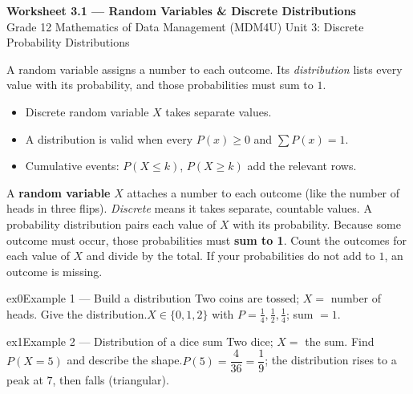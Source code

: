 \documentclass[11pt]{article}
\begin{document}
\begin{center}
{\LARGE\bfseries\color{titleblue}Worksheet 3.1 --- Random Variables \& Discrete Distributions}\\[2pt]
{\small Grade 12 Mathematics of Data Management (MDM4U) \textperiodcentered{} Unit 3: Discrete Probability Distributions}
\end{center}

\begin{ideabox}
A random variable assigns a number to each outcome. Its \emph{distribution} lists every value with its probability, and those probabilities must sum to $1$.
\begin{itemize}[leftmargin=*,itemsep=2pt]
  \item Discrete random variable $X$ takes separate values.
  \item A distribution is valid when every $P(x)\ge0$ and $\sum P(x)=1$.
  \item Cumulative events: $P(X\le k)$, $P(X\ge k)$ add the relevant rows.
\end{itemize}
\end{ideabox}

\begin{learnbox}
A \textbf{random variable} $X$ attaches a number to each outcome (like the number of heads in three flips). \emph{Discrete} means it takes separate, countable values.
A probability distribution pairs each value of $X$ with its probability. Because some outcome must occur, those probabilities must \textbf{sum to 1}.
Count the outcomes for each value of $X$ and divide by the total. If your probabilities do not add to $1$, an outcome is missing.
\end{learnbox}


\begin{example}{ex0}{Example 1 --- Build a distribution}
Two coins are tossed; $X=$ number of heads. Give the distribution.\soln $X\in\{0,1,2\}$ with $P=\tfrac14,\tfrac12,\tfrac14$; sum $=1$. \checkmark
\end{example}

\begin{example}{ex1}{Example 2 --- Distribution of a dice sum}
Two dice; $X=$ the sum. Find $P(X=5)$ and describe the shape.\soln $P(5)=\dfrac{4}{36}=\dfrac19$; the distribution rises to a peak at $7$, then falls (triangular).
\end{example}
\end{document}
